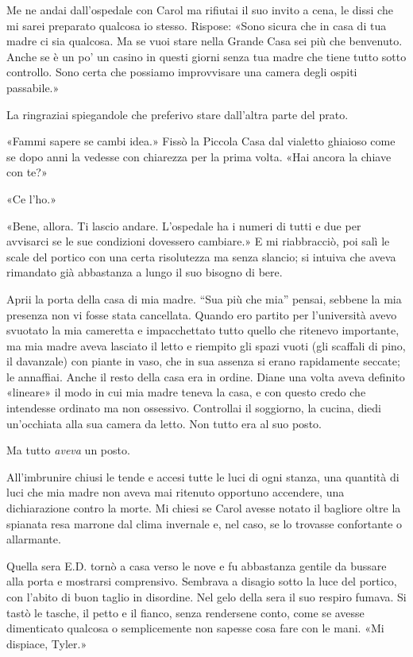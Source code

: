 \separatorefiori

Me ne andai dall'ospedale con Carol ma rifiutai il suo invito a cena, le
dissi che mi sarei preparato qualcosa io stesso. Rispose: «Sono sicura
che in casa di tua madre ci sia qualcosa. Ma se vuoi stare nella Grande
Casa sei più che benvenuto. Anche se è un po' un casino in questi giorni
senza tua madre che tiene tutto sotto controllo. Sono certa che possiamo
improvvisare una camera degli ospiti passabile.»

La ringraziai spiegandole che preferivo stare dall'altra parte del
prato.

«Fammi sapere se cambi idea.» Fissò la Piccola Casa dal vialetto
ghiaioso come se dopo anni la vedesse con chiarezza per la prima volta.
«Hai ancora la chiave con te?»

«Ce l'ho.»

«Bene, allora. Ti lascio andare. L'ospedale ha i numeri di tutti e due
per avvisarci se le sue condizioni dovessero cambiare.» E mi
riabbracciò, poi salì le scale del portico con una certa risolutezza ma
senza slancio; si intuiva che aveva rimandato già abbastanza a lungo il
suo bisogno di bere.

Aprii la porta della casa di mia madre. ``Sua più che mia'' pensai,
sebbene la mia presenza non vi fosse stata cancellata. Quando ero
partito per l'università avevo svuotato la mia cameretta e impacchettato
tutto quello che ritenevo importante, ma mia madre aveva lasciato il
letto e riempito gli spazi vuoti (gli scaffali di pino, il davanzale)
con piante in vaso, che in sua assenza si erano rapidamente seccate; le
annaffiai. Anche il resto della casa era in ordine. Diane una volta
aveva definito «lineare» il modo in cui mia madre teneva la casa, e con
questo credo che intendesse ordinato ma non ossessivo. Controllai il
soggiorno, la cucina, diedi un'occhiata alla sua camera da letto. Non
tutto era al suo posto.

Ma tutto \emph{aveva} un posto.

All'imbrunire chiusi le tende e accesi tutte le luci di ogni stanza, una
quantità di luci che mia madre non aveva mai ritenuto opportuno
accendere, una dichiarazione contro la morte. Mi chiesi se Carol avesse
notato il bagliore oltre la spianata resa marrone dal clima invernale e,
nel caso, se lo trovasse confortante o allarmante.

Quella sera E.D. tornò a casa verso le nove e fu abbastanza gentile da
bussare alla porta e mostrarsi comprensivo. Sembrava a disagio sotto la
luce del portico, con l'abito di buon taglio in disordine. Nel gelo
della sera il suo respiro fumava. Si tastò le tasche, il petto e il
fianco, senza rendersene conto, come se avesse dimenticato qualcosa o
semplicemente non sapesse cosa fare con le mani. «Mi dispiace, Tyler.»

